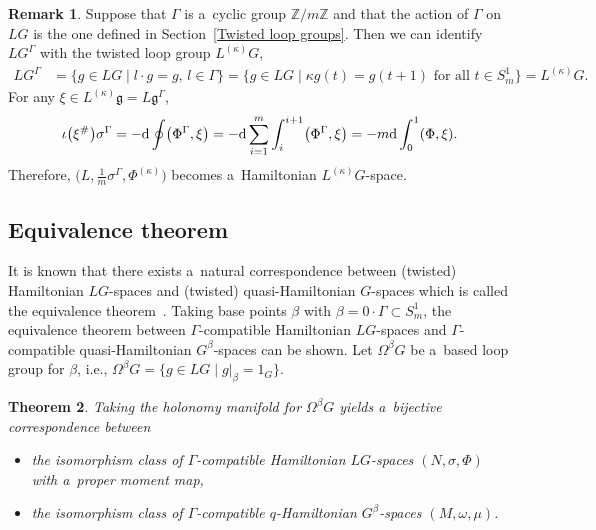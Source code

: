 \documentclass[pdftex]{sigma}
\numberwithin{equation}{section}
\newtheorem{Theorem}{Theorem}[section]
\theoremstyle{definition}
\newtheorem{Remark}[Theorem]{Remark}
\newcommand{\bZ}{\mathbb{Z}}
\begin{document}
\begin{Remark}Suppose that $\Gamma$ is a~cyclic group $\bZ/m\bZ$ and that the action of $\Gamma$ on $LG$ is the one defined in Section~\ref{Twisted loop groups}.
 Then we can identify $LG^{\Gamma}$ with the twisted loop group $L^{(\kappa)}G$,
\begin{align*}
 LG^{\Gamma} &= \{g \in LG\mid l\cdot g = g,\, l \in \Gamma\} = \bigl\{g \in LG\mid \kappa g(t) =g(t+1) \text{ for all }t \in S^1_m\bigr\}
 = L^{(\kappa)}G.
\end{align*}
For any $\xi \in L^{(\kappa)}\mathfrak{g} = L\mathfrak{g}^{\Gamma}$,
\begin{align*}
 \iota\bigl(\xi^{\#}\bigr)\sigma^{\Gamma}
 = -{\rm d} \oint \bigl(\Phi^{\Gamma}, \xi\bigr) = -{\rm d} \sum_{i=1}^{m} \int_{i}^{i+1} \bigl(\Phi^{\Gamma}, \xi\bigr)
 = -m{\rm d} \int_{0}^{1} (\Phi,\xi).
\end{align*}
Therefore, $\big(L, \frac{1}{m}\sigma^{\Gamma}, \Phi^{(\kappa)}\big)$ becomes a~Hamiltonian $L^{(\kappa)}G$-space.
\end{Remark}

\subsection{Equivalence theorem}
It is known that there exists a~natural correspondence between (twisted) Hamiltonian $LG$-spaces and (twisted) quasi-Hamiltonian $G$-spaces
which is called the equivalence theorem~\cite{AMM,LYM_twisted_LG,Meinrenken2017}.
Taking base points $\beta$ with $\beta = 0 \cdot \Gamma \subset S^{1}_m$, the equivalence theorem between $\Gamma$-compatible Hamiltonian $LG$-spaces and $\Gamma$-compatible quasi-Hamiltonian $G^{\beta}$-spaces can be shown.
Let $\Omega^{\beta}G$ be a~based loop group for $\beta $, i.e., $\Omega ^{\beta}G = \{g \in LG\mid g|_{\beta} = 1_G\}$.

\begin{Theorem}\label{equiv thm}
Taking the holonomy manifold for $\Omega^{\beta}G$ yields a~bijective correspondence between
\begin{itemize}\itemsep=0pt
 \item the isomorphism class of $\Gamma$-compatible Hamiltonian $LG$-spaces $(N,\sigma,\Phi)$ with a~proper moment map,
 \item the isomorphism class of $\Gamma$-compatible $q$-Hamiltonian $G^{\beta}$-spaces $(M,\omega,\mu)$.
\end{itemize}
\end{Theorem}
\end{document}
